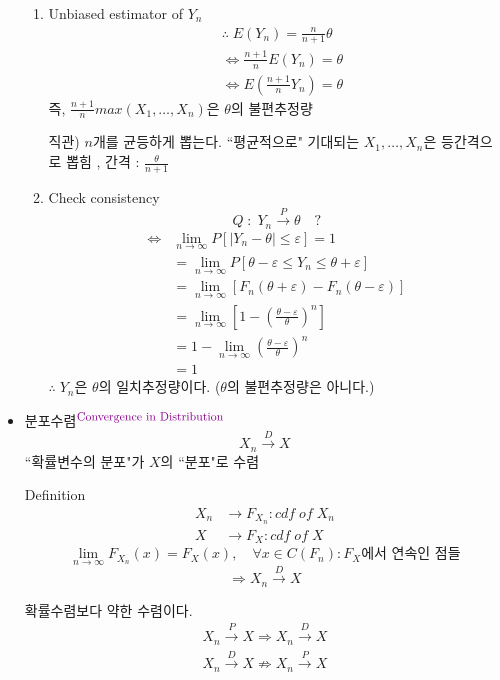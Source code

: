 \documentclass{oblivoir}
\newcommand{\DC}[1]{\textcolor{DarkMagenta}{#1}}%
\newcommand{\UP}[1]{$^{\mbox{\DC{\footnotesize #1}}}$}
\begin{document}
\begin{itemize}
\begin{enumerate}
\item Unbiased estimator of $Y_n$
\begin{align*}
&\therefore \; E(Y_n) = \frac{n}{n+1} \theta\\
&\Leftrightarrow \frac{n+1}{n} E(Y_n) = \theta \\
&\Leftrightarrow E\left(\frac{n+1}{n} Y_n \right)  = \theta
\end{align*}
즉, $\frac{n+1}{n} max(X_1, \ldots, X_n)$은 $\theta$의 불편추정량

직관) $n$개를 균등하게 뽑는다. ``평균적으로" 기대되는 $X_1, \ldots, X_n$은 등간격으로 뽑힘
, 간격 : $\frac{\theta}{n+1}$

\item Check consistency
$$
Q \; : \; Y_n \overset{P}{\longrightarrow} \theta \quad ?
$$
\begin{align*}
\Leftrightarrow& \lim_{n \rightarrow \infty} P[|Y_n - \theta| \leq \varepsilon] = 1 \\
&= \lim_{n \rightarrow \infty} P[\theta - \varepsilon \leq Y_n \leq \theta + \varepsilon] \\
&= \lim_{n \rightarrow \infty} [F_n(\theta+\varepsilon) - F_n(\theta-\varepsilon)] \\
&= \lim_{n \rightarrow \infty} \left[ 1 - \left(\frac{\theta - \varepsilon}{\theta}\right)^n \right] \\
&= 1 - \lim_{n \rightarrow \infty} \left( \frac{\theta - \varepsilon}{\theta}\right)^n \\
& = 1
\end{align*}
$\therefore \; Y_n$은 $\theta$의 일치추정량이다. ($\theta$의 불편추정량은 아니다.)
\end{enumerate}

\item 분포수렴\UP{Convergence in Distribution}
$$
X_n \overset{D}{\longrightarrow} X
$$
``확률변수의 분포"가 $X$의 ``분포"로 수렴 

\begin{myframe}{Definition}
\begin{align*}
X_n &\rightarrow F_{X_n} : cdf  \; of \;  X_n\\
X &\rightarrow F_{X} : cdf  \; of \;  X
\end{align*}
$$
\lim_{n \rightarrow \infty} F_{X_n}(x) = F_X(x), \quad \forall x \in C(F_n) : F_X\mbox{에서 연속인 점들}
$$
$$
\Rightarrow X_n \overset{D}{\longrightarrow} X
$$
\end{myframe}

확률수렴보다 약한 수렴이다.
\begin{align*}
X_n \overset{P}{\longrightarrow} X \Rightarrow X_n \overset{D}{\longrightarrow} X \\
X_n \overset{D}{\longrightarrow} X \not\Rightarrow X_n \overset{P}{\longrightarrow} X \\
\end{align*}


\end{itemize}
\end{document}

